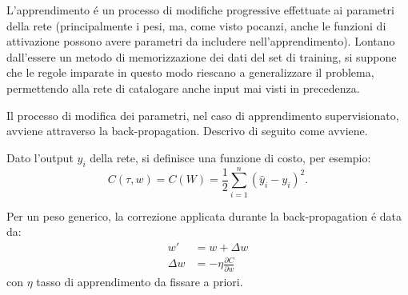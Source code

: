 \documentclass[a4paper,12pt]{report}
\begin{document}
 L'apprendimento \'e un processo di modifiche progressive effettuate ai parametri della rete (principalmente i pesi, ma, come visto pocanzi, anche le funzioni di attivazione possono avere parametri da includere nell'apprendimento). 
 Lontano dall'essere un metodo di memorizzazione dei dati del set di training, si suppone che le regole imparate in questo modo riescano a generalizzare il problema, permettendo alla rete di catalogare anche input mai visti in precedenza.
 
 Il processo di modifica dei parametri, nel caso di apprendimento supervisionato, avviene attraverso la back-propagation. Descrivo di seguito come avviene.
 
 Dato l'output $y_i$ della rete, si definisce una funzione di costo, per esempio:
 \begin{equation}
  C(\tau,w) = C(W) = \frac{1}{2} \sum_{i=1}^n (\widehat{y}_i-y_i)^2.
 \end{equation}
 
 Per un peso generico, la correzione applicata durante la back-propagation \'e data da:
 \begin{align}
  w' &= w + \Delta w \\
  \Delta w &= - \eta \frac{\partial C}{\partial w}
 \end{align}
 con $\eta$ tasso di apprendimento da fissare a priori.
 
\end{document}
